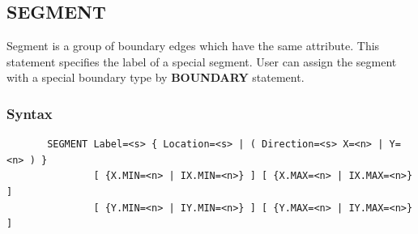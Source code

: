 \documentclass[11pt,pdftex]{article}
\begin{document}
\newpage
\subsection{SEGMENT}
Segment is a group of boundary edges which have the same attribute.
This statement specifies the label of a special segment. User can
assign the segment with a special boundary type by \textbf{BOUNDARY}
statement.

\subsubsection*{Syntax}
\begin{verbatim}
       SEGMENT Label=<s> { Location=<s> | ( Direction=<s> X=<n> | Y=<n> ) }
               [ {X.MIN=<n> | IX.MIN=<n>} ] [ {X.MAX=<n> | IX.MAX=<n>} ]
               [ {Y.MIN=<n> | IY.MIN=<n>} ] [ {Y.MAX=<n> | IY.MAX=<n>} ]
\end{verbatim}
\end{document}
